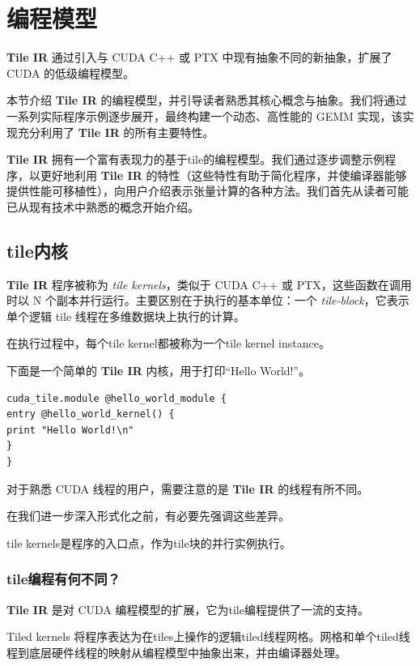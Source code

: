 \documentclass{article}
\begin{document}
\newpage
\section{编程模型}

\textbf{Tile IR} 通过引入与 CUDA C++ 或 PTX 中现有抽象不同的新抽象，扩展了 CUDA 的低级编程模型。


本节介绍 \textbf{Tile IR} 的编程模型，并引导读者熟悉其核心概念与抽象。我们将通过一系列实际程序示例逐步展开，最终构建一个动态、高性能的 GEMM 实现，该实现充分利用了 \textbf{Tile IR} 的所有主要特性。


\textbf{Tile IR} 拥有一个富有表现力的基于tile的编程模型。我们通过逐步调整示例程序，以更好地利用 \textbf{Tile IR} 的特性（这些特性有助于简化程序，并使编译器能够提供性能可移植性），向用户介绍表示张量计算的各种方法。我们首先从读者可能已从现有技术中熟悉的概念开始介绍。


\subsection{tile内核}

\textbf{Tile IR} 程序被称为 \textit{tile kernels}，类似于 CUDA C++ 或 PTX，这些函数在调用时以 N 个副本并行运行。主要区别在于执行的基本单位：一个 \textit{tile-block}，它表示单个逻辑 tile 线程在多维数据块上执行的计算。


在执行过程中，每个tile kernel都被称为一个tile kernel instance。


下面是一个简单的 \textbf{Tile IR} 内核，用于打印``Hello World!''。


\begin{lstlisting}
cuda_tile.module @hello_world_module {
entry @hello_world_kernel() {
print "Hello World!\n"
}
}
\end{lstlisting}

对于熟悉 CUDA 线程的用户，需要注意的是 \textbf{Tile IR} 的线程有所不同。

在我们进一步深入形式化之前，有必要先强调这些差异。


tile kernels是程序的入口点，作为tile块的并行实例执行。


\subsubsection{tile编程有何不同？}

\textbf{Tile IR} 是对 CUDA 编程模型的扩展，它为tile编程提供了一流的支持。

Tiled kernels 将程序表达为在tiles上操作的逻辑tiled线程网格。网格和单个tiled线程到底层硬件线程的映射从编程模型中抽象出来，并由编译器处理。
\end{document}
